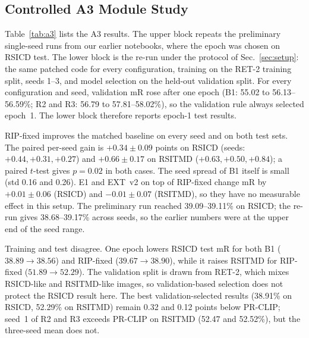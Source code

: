 \documentclass[conference]{IEEEtran}
\begin{document}
\subsection{Controlled A3 Module Study}
\label{sec:a3}
Table~\ref{tab:a3} lists the A3 results. The upper block repeats the preliminary single-seed runs from our earlier notebooks, where the epoch was chosen on RSICD test. The lower block is the re-run under the protocol of Sec.~\ref{sec:setup}: the same patched code for every configuration, training on the RET-2 training split, seeds 1--3, and model selection on the held-out validation split. For every configuration and seed, validation mR rose after one epoch (B1: 55.02 to 56.13--56.59\%; R2 and R3: 56.79 to 57.81--58.02\%), so the validation rule always selected epoch~1. The lower block therefore reports epoch-1 test results.

RIP-fixed improves the matched baseline on every seed and on both test sets. The paired per-seed gain is $+0.34 \pm 0.09$ points on RSICD (seeds: $+0.44, +0.31, +0.27$) and $+0.66 \pm 0.17$ on RSITMD ($+0.63, +0.50, +0.84$); a paired $t$-test gives $p=0.02$ in both cases. The seed spread of B1 itself is small (std 0.16 and 0.26). E1 and EXT~v2 on top of RIP-fixed change mR by $+0.01 \pm 0.06$ (RSICD) and $-0.01 \pm 0.07$ (RSITMD), so they have no measurable effect in this setup. The preliminary run reached 39.09--39.11\% on RSICD; the re-run gives 38.68--39.17\% across seeds, so the earlier numbers were at the upper end of the seed range.

Training and test disagree. One epoch lowers RSICD test mR for both B1 ($38.89 \to 38.56$) and RIP-fixed ($39.67 \to 38.90$), while it raises RSITMD for RIP-fixed ($51.89 \to 52.29$). The validation split is drawn from RET-2, which mixes RSICD-like and RSITMD-like images, so validation-based selection does not protect the RSICD result here. The best validation-selected results (38.91\% on RSICD, 52.29\% on RSITMD) remain 0.32 and 0.12 points below PR-CLIP; seed~1 of R2 and R3 exceeds PR-CLIP on RSITMD (52.47 and 52.52\%), but the three-seed mean does not.
\end{document}

